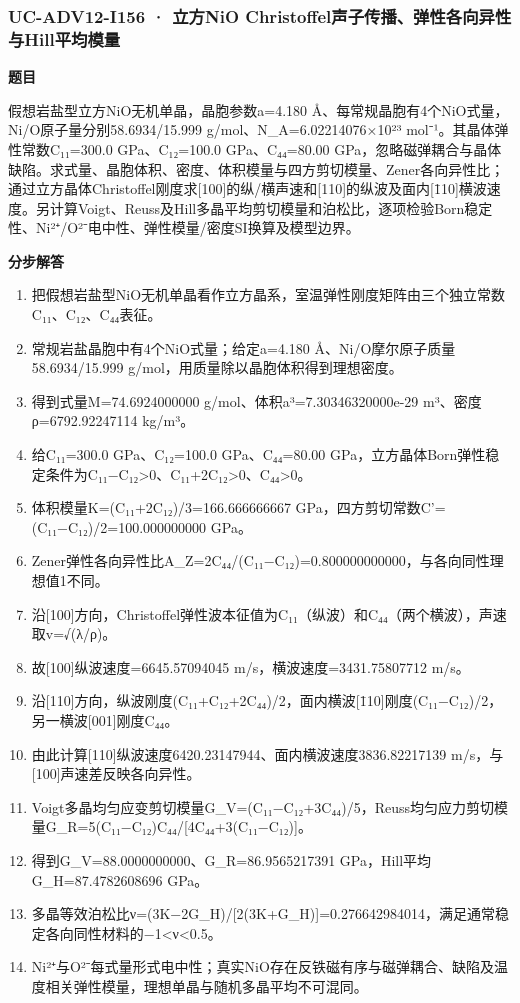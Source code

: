 \documentclass[UTF8,11pt,a4paper]{ctexart}
\begin{document}
\subsubsection*{UC-ADV12-I156 · 立方NiO Christoffel声子传播、弹性各向异性与Hill平均模量}
\noindent\textbf{题目}\par
假想岩盐型立方NiO无机单晶，晶胞参数a=4.180 Å、每常规晶胞有4个NiO式量，Ni/O原子量分别58.6934/15.999 g/mol、N\_A=6.02214076×10²³ mol⁻¹。其晶体弹性常数C₁₁=300.0 GPa、C₁₂=100.0 GPa、C₄₄=80.00 GPa，忽略磁弹耦合与晶体缺陷。求式量、晶胞体积、密度、体积模量与四方剪切模量、Zener各向异性比；通过立方晶体Christoffel刚度求[100]的纵/横声速和[110]的纵波及面内[1̄10]横波速度。另计算Voigt、Reuss及Hill多晶平均剪切模量和泊松比，逐项检验Born稳定性、Ni²⁺/O²⁻电中性、弹性模量/密度SI换算及模型边界。\par
\medskip\noindent\textbf{分步解答}
\begin{enumerate}
\item 把假想岩盐型NiO无机单晶看作立方晶系，室温弹性刚度矩阵由三个独立常数C₁₁、C₁₂、C₄₄表征。
\item 常规岩盐晶胞中有4个NiO式量；给定a=4.180 Å、Ni/O摩尔原子质量58.6934/15.999 g/mol，用质量除以晶胞体积得到理想密度。
\item 得到式量M=74.6924000000 g/mol、体积a³=7.30346320000e-29 m³、密度ρ=6792.92247114 kg/m³。
\item 给C₁₁=300.0 GPa、C₁₂=100.0 GPa、C₄₄=80.00 GPa，立方晶体Born弹性稳定条件为C₁₁−C₁₂>0、C₁₁+2C₁₂>0、C₄₄>0。
\item 体积模量K=(C₁₁+2C₁₂)/3=166.666666667 GPa，四方剪切常数C'=(C₁₁−C₁₂)/2=100.000000000 GPa。
\item Zener弹性各向异性比A\_Z=2C₄₄/(C₁₁−C₁₂)=0.800000000000，与各向同性理想值1不同。
\item 沿[100]方向，Christoffel弹性波本征值为C₁₁（纵波）和C₄₄（两个横波），声速取v=√(λ/ρ)。
\item 故[100]纵波速度=6645.57094045 m/s，横波速度=3431.75807712 m/s。
\item 沿[110]方向，纵波刚度(C₁₁+C₁₂+2C₄₄)/2，面内横波[1̄10]刚度(C₁₁−C₁₂)/2，另一横波[001]刚度C₄₄。
\item 由此计算[110]纵波速度6420.23147944、面内横波速度3836.82217139 m/s，与[100]声速差反映各向异性。
\item Voigt多晶均匀应变剪切模量G\_V=(C₁₁−C₁₂+3C₄₄)/5，Reuss均匀应力剪切模量G\_R=5(C₁₁−C₁₂)C₄₄/[4C₄₄+3(C₁₁−C₁₂)]。
\item 得到G\_V=88.0000000000、G\_R=86.9565217391 GPa，Hill平均G\_H=87.4782608696 GPa。
\item 多晶等效泊松比ν=(3K−2G\_H)/[2(3K+G\_H)]=0.276642984014，满足通常稳定各向同性材料的−1<ν<0.5。
\item Ni²⁺与O²⁻每式量形式电中性；真实NiO存在反铁磁有序与磁弹耦合、缺陷及温度相关弹性模量，理想单晶与随机多晶平均不可混同。
\end{enumerate}
\end{document}
